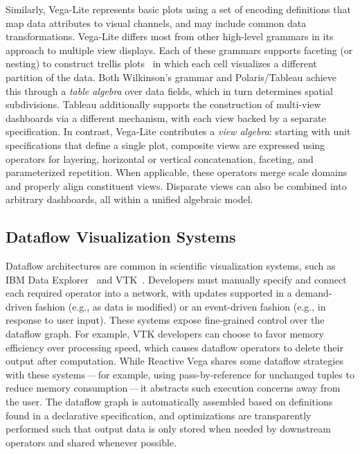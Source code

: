 Similarly, Vega-Lite represents basic plots using a set of encoding definitions
that map data attributes to visual channels, and may include common data
transformations. Vega-Lite differs most from other high-level grammars in its
approach to multiple view displays. Each of these grammars supports faceting (or
nesting) to construct trellis plots~\cite{becker:trellis} in which each cell
visualizes a different partition of the data. Both Wilkinson's grammar and
Polaris/Tableau achieve this through a \emph{table algebra} over data fields,
which in turn determines spatial subdivisions. Tableau additionally supports the
construction of multi-view dashboards via a different mechanism, with each view
backed by a separate specification. In contrast, Vega-Lite contributes a
\emph{view algebra}: starting with unit specifications that define a single
plot, composite views are expressed using operators for layering, horizontal or
vertical concatenation, faceting, and parameterized repetition. When applicable,
these operators merge scale domains and properly align constituent views.
Disparate views can also be combined into arbitrary dashboards, all within a
unified algebraic model.

\vspace{-10pt}

\subsection{Dataflow Visualization Systems}

\vspace{-10pt}

Dataflow architectures are common in scientific visualization systems, such as
IBM Data Explorer~\cite{lucas:dataflow,abram:ibmdx} and
VTK~\cite{schroeder:vtk}. Developers must manually specify and connect each
required operator into a network, with updates supported in a demand-driven
fashion (e.g., as data is modified) or an event-driven fashion (e.g., in
response to user input). These systems expose fine-grained control over the
dataflow graph. For example, VTK developers can choose to favor memory
efficiency over processing speed, which causes dataflow operators to delete
their output after computation. While Reactive Vega shares some dataflow
strategies with these systems\,---\,for example, using pass-by-reference for
unchanged tuples to reduce memory consumption\,---\,it abstracts such execution
concerns away from the user. The dataflow graph is automatically assembled based
on definitions found in a declarative specification, and optimizations are
transparently performed such that output data is only stored when needed by
downstream operators and shared whenever possible.

